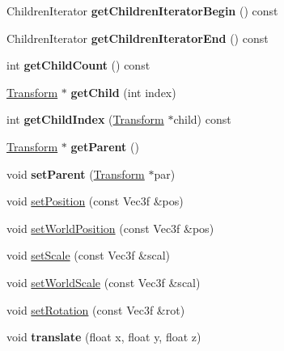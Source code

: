 \begin{DoxyCompactItemize}
\item 
\hypertarget{class_transform_a7961b68e168fd48a7c6a0e7a378acfeb}{
ChildrenIterator {\bfseries getChildrenIteratorBegin} () const }
\label{class_transform_a7961b68e168fd48a7c6a0e7a378acfeb}

\item 
\hypertarget{class_transform_ad12f0221301787ba9b806e1398f56f9d}{
ChildrenIterator {\bfseries getChildrenIteratorEnd} () const }
\label{class_transform_ad12f0221301787ba9b806e1398f56f9d}

\item 
\hypertarget{class_transform_ae09f6770d60d2644d36eb666899a91ed}{
int {\bfseries getChildCount} () const }
\label{class_transform_ae09f6770d60d2644d36eb666899a91ed}

\item 
\hypertarget{class_transform_a79b644e5db68374184142d8d95df6934}{
\hyperlink{class_transform}{Transform} $\ast$ {\bfseries getChild} (int index)}
\label{class_transform_a79b644e5db68374184142d8d95df6934}

\item 
\hypertarget{class_transform_ad9f5a1d8320c3280bff5189b8e800b34}{
int {\bfseries getChildIndex} (\hyperlink{class_transform}{Transform} $\ast$child) const }
\label{class_transform_ad9f5a1d8320c3280bff5189b8e800b34}

\item 
\hypertarget{class_transform_ae3e8acbd25d7d171aff00da038f79a9a}{
\hyperlink{class_transform}{Transform} $\ast$ {\bfseries getParent} ()}
\label{class_transform_ae3e8acbd25d7d171aff00da038f79a9a}

\item 
\hypertarget{class_transform_a0bbb28cce7bca9363703b41ca10dcc57}{
void {\bfseries setParent} (\hyperlink{class_transform}{Transform} $\ast$par)}
\label{class_transform_a0bbb28cce7bca9363703b41ca10dcc57}

\item 
void \hyperlink{class_transform_a5a8d1890adf4dbba15a436f55f21c601}{setPosition} (const Vec3f \&pos)
\item 
void \hyperlink{class_transform_a08ced4e72301c25f99dedd54859fb23b}{setWorldPosition} (const Vec3f \&pos)
\item 
void \hyperlink{class_transform_a42d7de04d07befc5f7e5fd53c5ea7a46}{setScale} (const Vec3f \&scal)
\item 
void \hyperlink{class_transform_abe5b02d0f0bdcb854c26f1b81a4affde}{setWorldScale} (const Vec3f \&scal)
\item 
void \hyperlink{class_transform_a81bd0c59e3e584f6cefc63de81de7471}{setRotation} (const Vec3f \&rot)
\item 
\hypertarget{class_transform_a6fec9382d9851c08c303fbad1ae51f51}{
void {\bfseries translate} (float x, float y, float z)}
\label{class_transform_a6fec9382d9851c08c303fbad1ae51f51}


\end{DoxyCompactItemize}
